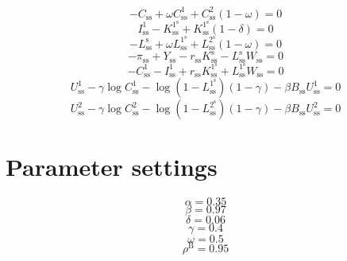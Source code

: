 \begin{equation}
-C_\mathrm{ss} + {\omega} {C^{\mathrm{1}}_\mathrm{ss}} + {C^{\mathrm{2}}_\mathrm{ss}} \left(1 - \omega\right) = 0
\end{equation}
\begin{equation}
I^{\mathrm{1}}_\mathrm{ss} - K^{\mathrm{1}^{\mathrm{s}}}_\mathrm{ss} + {K^{\mathrm{1}^{\mathrm{s}}}_\mathrm{ss}} \left(1 - \delta\right) = 0
\end{equation}
\begin{equation}
-L^{\mathrm{s}}_\mathrm{ss} + {\omega} {L^{\mathrm{1}^{\mathrm{s}}}_\mathrm{ss}} + {L^{\mathrm{2}^{\mathrm{s}}}_\mathrm{ss}} \left(1 - \omega\right) = 0
\end{equation}
\begin{equation}
-\pi_\mathrm{ss} + Y_\mathrm{ss} - {r_\mathrm{ss}} {K^{\mathrm{s}}_\mathrm{ss}} - {L^{\mathrm{s}}_\mathrm{ss}} {W_\mathrm{ss}} = 0
\end{equation}
\begin{equation}
-C^{\mathrm{1}}_\mathrm{ss} - I^{\mathrm{1}}_\mathrm{ss} + {r_\mathrm{ss}} {K^{\mathrm{1}^{\mathrm{s}}}_\mathrm{ss}} + {L^{\mathrm{1}^{\mathrm{s}}}_\mathrm{ss}} {W_\mathrm{ss}} = 0
\end{equation}
\begin{equation}
U^{\mathrm{1}}_\mathrm{ss} - {\gamma} {\log{C^{\mathrm{1}}_\mathrm{ss}}} - {\log\left(1 - L^{\mathrm{1}^{\mathrm{s}}}_\mathrm{ss}\right)} \left(1 - \gamma\right) - {\beta} {B_\mathrm{ss}} {U^{\mathrm{1}}_\mathrm{ss}} = 0
\end{equation}
\begin{equation}
U^{\mathrm{2}}_\mathrm{ss} - {\gamma} {\log{C^{\mathrm{2}}_\mathrm{ss}}} - {\log\left(1 - L^{\mathrm{2}^{\mathrm{s}}}_\mathrm{ss}\right)} \left(1 - \gamma\right) - {\beta} {B_\mathrm{ss}} {U^{\mathrm{2}}_\mathrm{ss}} = 0
\end{equation}






\section{Parameter settings}

\begin{equation}
\alpha = 0.35
\end{equation}
\begin{equation}
\beta = 0.97
\end{equation}
\begin{equation}
\delta = 0.06
\end{equation}
\begin{equation}
\gamma = 0.4
\end{equation}
\begin{equation}
\omega = 0.5
\end{equation}
\begin{equation}
\rho^{\mathrm{B}} = 0.95
\end{equation}


